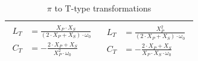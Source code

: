 \begin{table}[H]
\begin{tabular}{ | c | c | }
    \begin{minipage}{.4\textwidth}
         { \begin{align}
              L_T &= \frac{X_P \cdot X_S}{(2 \cdot X_P + X_S) \cdot \omega_0} \\
              C_T &= -\frac{2 \cdot X_P + X_S}{X_P^2 \cdot \omega_0}
     \end{align}}
    \end{minipage}
    &
        \begin{minipage}{.4\textwidth}
         { \begin{align}
              L_T &= \frac{X_P ^2}{(2 \cdot X_P + X_S) \cdot \omega_0}\\
              C_T &= -\frac{2 \cdot X_P + X_S}{X_P \cdot X_S \cdot \omega_0}
     \end{align}}
    \end{minipage}
    \\ \hline
  \end{tabular}
  \caption{$\pi$ to T-type transformations}
  \label{tbl:pi-to-tee-transformation}
\end{table}


